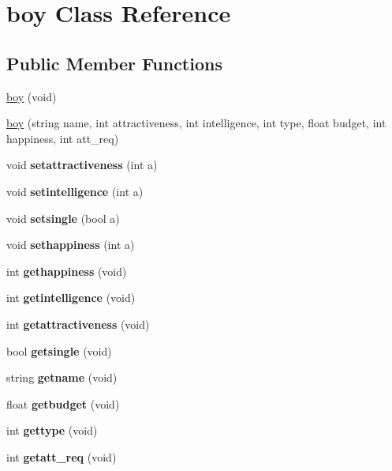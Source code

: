 \hypertarget{classboy}{}\section{boy Class Reference}
\label{classboy}
\subsection*{Public Member Functions}
\begin{DoxyCompactItemize}
\item 
\hyperlink{classboy_a6db802fcf1b08200d6c69552409a836d}{boy} (void)
\item 
\hyperlink{classboy_a56b23dfb0d5e95ff41896e83a2a443ac}{boy} (string name, int attractiveness, int intelligence, int type, float budget, int happiness, int att\+\_\+req)
\item 
\mbox{\label{classboy_a8f97372d659b4bb439ee1025a1bf22a9}} 
void {\bfseries setattractiveness} (int a)
\item 
\mbox{\label{classboy_a1736a8406eca4e469adeed65705bd5d9}} 
void {\bfseries setintelligence} (int a)
\item 
\mbox{\label{classboy_a1a2a188d2b8aaebe8b4c0831472801b1}} 
void {\bfseries setsingle} (bool a)
\item 
\mbox{\label{classboy_a82cba47065834c64a3a031b66f8ed966}} 
void {\bfseries sethappiness} (int a)
\item 
\mbox{\label{classboy_a38868d53ebce6732754e62ab69922bb4}} 
int {\bfseries gethappiness} (void)
\item 
\mbox{\label{classboy_a8637d93a8535c8786fa8b16d5712733e}} 
int {\bfseries getintelligence} (void)
\item 
\mbox{\label{classboy_a31858179942bf39b6008c86df69d1db0}} 
int {\bfseries getattractiveness} (void)
\item 
\mbox{\label{classboy_ad371335d335a741be7413d9b99dc7000}} 
bool {\bfseries getsingle} (void)
\item 
\mbox{\label{classboy_a034701432eb4a29f9c820eec0dc9f226}} 
string {\bfseries getname} (void)
\item 
\mbox{\label{classboy_a52c89921019b599851f3350d4e4817f3}} 
float {\bfseries getbudget} (void)
\item 
\mbox{\label{classboy_a45803be06325d28b7b532b8084c9c5ad}} 
int {\bfseries gettype} (void)
\item 
\mbox{\label{classboy_a7494325b14bdf6746ed29cdab165d259}} 
int {\bfseries getatt\+\_\+req} (void)
\end{DoxyCompactItemize}


